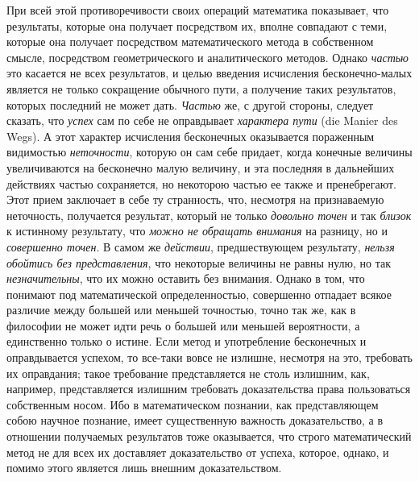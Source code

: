 При всей этой противоречивости своих операций математика показывает, что
результаты, которые она получает посредством их, вполне совпадают с теми,
которые она получает посредством математического метода в собственном
смысле, посредством геометрического и аналитического методов. Однако
{\em частью} это касается не всех результатов, и целью
введения исчисления бесконечно-малых является не только сокращение обычного
пути, а получение таких результатов, которых последний не может дать.
{\em Частью} же, с другой стороны, следует сказать, что
{\em успех} сам по себе не оправдывает
{\em характера пути} (die Manier des Wegs). А этот
характер исчисления бесконечных оказывается пораженным видимостью
{\em неточности}, которую он сам себе придает, когда
конечные величины увеличиваются на бесконечно малую величину, и эта
последняя в дальнейших действиях частью сохраняется, но некоторою частью ее
также и пренебрегают. Этот прием заключает в себе ту странность, что,
несмотря на признаваемую неточность, получается результат, который не
только {\em довольно точен} и так
{\em близок} к истинному результату, что
{\em можно не обращать внимания} на разницу, но и
{\em совершенно точен}. В самом же
{\em действии}, предшествующем результату,
{\em нельзя обойтись без представления}, что некоторые
величины не равны нулю, но так {\em незначительны}, что
их можно оставить без внимания. Однако в том, что понимают под
математической определенностью, совершенно отпадает всякое различие между
большей или меньшей точностью, точно так же, как в философии не может идти
речь о большей или меньшей вероятности, а единственно только о истине. Если
метод и употребление бесконечных и оправдывается успехом, то все-таки вовсе
не излишне, несмотря на это, требовать их оправдания; такое требование
представляется не столь излишним, как, например, представляется излишним
требовать доказательства права пользоваться собственным
носом. Ибо в математическом познании,
как представляющем собою научное познание, имеет существенную важность
доказательство, а в отношении получаемых результатов тоже оказывается, что
строго математический метод не для всех их доставляет доказательство от
успеха, которое, однако, и помимо этого является лишь внешним
доказательством.

